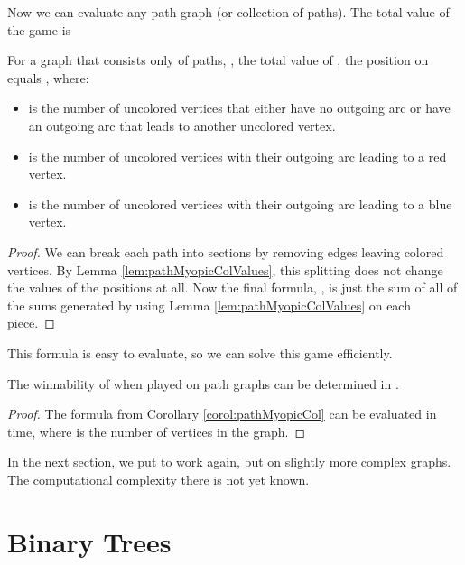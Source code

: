 \documentclass[letter,10pt]{article}
\begin{document}
Now we can evaluate any path graph (or collection of paths).  The total value of the game is 

\begin{corollary}
\label{corol:pathMyopicCol}
    For a graph that consists only of paths, , the total value of , the  position on  equals , where:
    \begin{itemize}
        \item  is the number of uncolored vertices that either have no outgoing arc or have an outgoing arc that leads to another uncolored vertex.
        \item  is the number of uncolored vertices with their outgoing arc leading to a red vertex.
        \item  is the number of uncolored vertices with their outgoing arc leading to a blue vertex.
    \end{itemize}
\end{corollary}

\begin{proof}
    We can break each path into sections by removing edges leaving colored vertices.  By Lemma \ref{lem:pathMyopicColValues}, this splitting does not change the values of the positions at all.  Now the final formula, , is just the sum of all of the sums generated by using Lemma \ref{lem:pathMyopicColValues} on each piece.
\end{proof}

This formula is easy to evaluate, so we can solve this game efficiently.

\begin{corollary}
    The winnability of  when played on path graphs can be determined in .
\end{corollary}

\begin{proof}
    The formula from Corollary \ref{corol:pathMyopicCol} can be evaluated in  time, where  is the number of vertices in the graph.
\end{proof}

In the next section, we put  to work again, but on slightly more complex graphs.  The computational complexity there is not yet known.

\section{Binary Trees}
\label{section:binary-trees}
\end{document}
